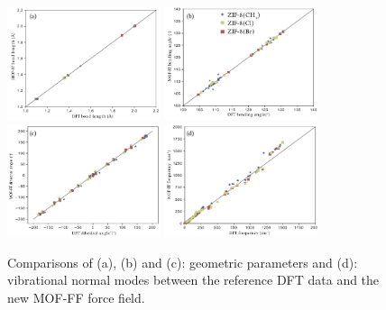 \documentclass[thesis]{subfiles}
\begin{document}
\begin{figure}[t]
    \centering
    \includegraphics[width=0.4\textwidth]{figures/images/mof-ff/validation-bonds}
    \includegraphics[width=0.4\textwidth]{figures/images/mof-ff/validation-angles}
    \includegraphics[width=0.4\textwidth]{figures/images/mof-ff/validation-dihedrals}
    \includegraphics[width=0.4\textwidth]{figures/images/mof-ff/validation-vibrations}
    \caption{Comparisons of (a), (b) and (c): geometric parameters and (d):
    vibrational normal modes between the reference DFT data and the new MOF-FF
    force field.}
    \label{fig:fig:mof-ff:validation}
\end{figure}
\end{document}
